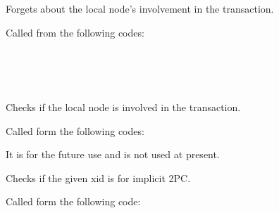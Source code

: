       Forgets about the local node's involvement in the transaction.
      
      Called from the following codes:
      
      \FuncRefHdr
		  \vspace{-10pt} \\
		  \vspace{-10pt} \\
		  \vspace{-10pt} \\ \hline
      \FuncRefTrailor
  
  
      Checks if the local node is involved in the transaction.
      
      Called form the following codes:
      
      It is for the future use and is not used at present.
  
  
      Checks if the given xid is for implicit 2PC.
      
      Called form the following code:
      
      \FuncRefHdr
		  \\ \hline
      \FuncRefTrailor
